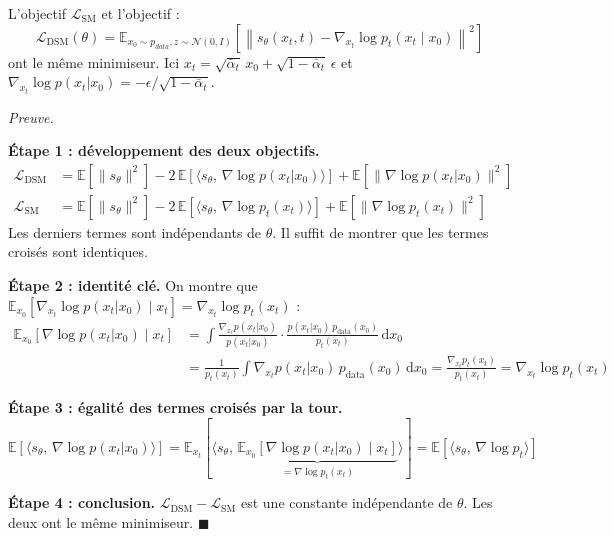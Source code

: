 \documentclass[12pt]{article}
\renewcommand{\qedsymbol}{$\blacksquare$}
\renewenvironment{proof}[1][\proofname]{%
  \par\medskip\noindent
  \textit{\color{proofgray}#1.}\enspace\ignorespaces
}{\hfill\qedsymbol\par\medskip}
\renewcommand{\proofname}{Preuve}
\begin{document}
\begin{resultbox}
\label{thm:dsm}
L'objectif $\mathcal{L}_{\text{SM}}$ et l'objectif :
\begin{equation}
    \mathcal{L}_{\text{DSM}}(\theta) = \mathbb{E}_{x_0 \sim p_{data}, z \sim \mathcal{N}(0,I)}\!\left[\left\|s_\theta(x_t, t) - \nabla_{x_t} \log p_t(x_t \mid x_0)\right\|^2\right]
\end{equation}
ont le même minimiseur. Ici $x_t = \sqrt{\bar\alpha_t}\, x_0 + \sqrt{1-\bar\alpha_t}\, \epsilon$ et $\nabla_{x_t} \log p(x_t | x_0) = -\epsilon/\sqrt{1-\bar\alpha_t}$.
\end{resultbox}

  \begin{proof}







\textbf{Étape 1 : développement des deux objectifs.}
\begin{align}
    \mathcal{L}_{\text{DSM}} &= \mathbb{E}[\|s_\theta\|^2] - 2\,\mathbb{E}[\langle s_\theta,\, \nabla \log p(x_t|x_0)\rangle] + \mathbb{E}[\|\nabla \log p(x_t|x_0)\|^2] \\
    \mathcal{L}_{\text{SM}} &= \mathbb{E}[\|s_\theta\|^2] - 2\,\mathbb{E}[\langle s_\theta,\, \nabla \log p_t(x_t)\rangle] + \mathbb{E}[\|\nabla \log p_t(x_t)\|^2]
\end{align}
Les derniers termes sont indépendants de $\theta$. Il suffit de montrer que les termes croisés sont identiques.

\textbf{Étape 2 : identité clé.} On montre que $\mathbb{E}_{x_0}[\nabla_{x_t} \log p(x_t|x_0) \mid x_t] = \nabla_{x_t} \log p_t(x_t)$ :
\begin{align}
    \mathbb{E}_{x_0}[\nabla \log p(x_t|x_0) \mid x_t] &= \int \frac{\nabla_{x_t} p(x_t|x_0)}{p(x_t|x_0)} \cdot \frac{p(x_t|x_0)\, p_{\text{data}}(x_0)}{p_t(x_t)}\, \mathrm{d}x_0 \nonumber\\
    &= \frac{1}{p_t(x_t)} \int \nabla_{x_t} p(x_t|x_0)\, p_{\text{data}}(x_0)\, \mathrm{d}x_0 = \frac{\nabla_{x_t} p_t(x_t)}{p_t(x_t)} = \nabla_{x_t} \log p_t(x_t)
\end{align}

\textbf{Étape 3 : égalité des termes croisés par la tour.}
\[
\mathbb{E}[\langle s_\theta,\, \nabla \log p(x_t|x_0)\rangle] = \mathbb{E}_{x_t}\!\left[\langle s_\theta,\, \underbrace{\mathbb{E}_{x_0}[\nabla \log p(x_t|x_0) \mid x_t]}_{= \nabla \log p_t(x_t)}\rangle\right] = \mathbb{E}[\langle s_\theta,\, \nabla \log p_t\rangle]
\]

\textbf{Étape 4 : conclusion.} $\mathcal{L}_{\text{DSM}} - \mathcal{L}_{\text{SM}}$ est une constante indépendante de $\theta$. Les deux ont le même minimiseur.
\end{proof}
\end{document}
